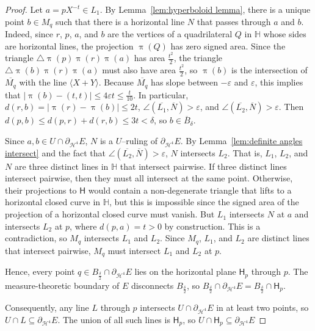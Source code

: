 \documentclass[11pt,reqno]{amsart}
\renewcommand{\H}{\mathbb{H}}
\newcommand{\cH}{\mathcal{H}}
\renewcommand{\epsilon}{\varepsilon}
\newcommand{\0}{\mathbf{0}}
\renewcommand{\1}{\mathbf 1}
\renewcommand{\subset}{\subseteq}
\renewcommand{\le}{\leqslant}
\theoremstyle{remark}
\begin{document}
\begin{proof}
  Let $a=pX^{-t}\in L_1$.  By Lemma~\ref{lem:hyperboloid lemma}, there is a unique point $b\in M_q$ such that there is a horizontal line $N$ that passes through $a$ and $b$. Indeed, since $r$, $p$, $a$, and $b$ are the vertices of a quadrilateral $Q$ in $\H$ whose sides are horizontal lines, the projection $\uppi(Q)$ has zero signed area. Since the triangle $\triangle\uppi(p)\uppi(r)\uppi(a)$ has area $\frac{t^2}{2}$, the triangle $\triangle\uppi(b)\uppi(r)\uppi(a)$ must also have area $\frac{t^2}{2}$, so $\uppi(b)$ is the intersection of $\overline{M_q}$ with the line $\langle X+Y\rangle$. Because $\overline{M_q}$ has slope between $-\epsilon$ and $\epsilon$, this implies that $|\uppi(b)-(t,t)|\le 4\epsilon t \le \frac{t}{10}$. In particular, $d(r,b)=|\uppi(r)-\uppi(b)|\le 2t$, $\angle(\overline{L_1},\overline{N})> \epsilon$, and $\angle(\overline{L_2},\overline{N})> \epsilon$. Then $d(p,b)\le d(p,r)+d(r,b)\le 3t<\delta$, so $b\in \overline{B}_\delta$.

  Since $a, b\in U\cap \partial_{\cH^4} E$, $N$ is a $U$--ruling of $\partial_{\cH^4} E$. By Lemma~\ref{lem:definite angles intersect} and the fact that $\angle(\overline{L_2},\overline{N})> \epsilon$, $N$ intersects $L_2$. That is, $L_1$, $L_2$, and $N$ are three distinct lines in $\H$ that intersect pairwise. If three distinct lines intersect pairwise, then they must all intersect at the same point. Otherwise, their projections to $\mathsf{H}$ would contain a non-degenerate triangle that lifts to a horizontal closed curve in $\H$, but this is impossible since the signed area of the projection of a horizontal closed curve must vanish. But $L_1$ intersects $N$ at $a$ and intersects $L_2$ at $p$, where $d(p,a)=t>0$ by construction. This is a contradiction, so $M_q$ intersects $L_1$ and $L_2$. Since $M_q$, $L_1$, and $L_2$ are distinct lines that intersect pairwise, $M_q$ must intersect $L_1$ and $L_2$ at $p$.

  Hence, every point $q\in B_{\frac{\delta}{2}}\cap \partial_{\cH^4} E$ lies on the horizontal plane $\mathsf{H}_p$ through $p$.  The measure-theoretic boundary of $E$ disconnects $B_{\frac{\delta}{2}}$, so $B_{\frac{\delta}{2}}\cap \partial_{\cH^4} E=B_{\frac{\delta}{2}}\cap \mathsf{H}_p$.

  Consequently, any line $L$ through $p$ intersects $U\cap \partial_{\cH^4} E$ in at least two points, so $U\cap L \subset \partial_{\cH^4} E$.  The union of all such lines is $\mathsf{H}_p$, so $U\cap \mathsf{H}_p \subset \partial_{\cH^4} E$
\end{proof}
\end{document}
